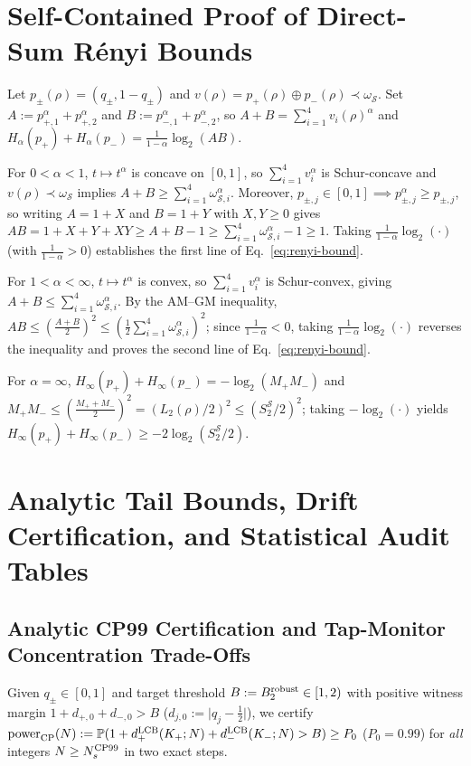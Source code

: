 \documentclass{iopjournal}
\newcommand{\Sset}{\mathcal{S}}
\newcommand{\abs}[1]{\lvert #1\rvert}
\begin{document}
\section{Self-Contained Proof of Direct-Sum R\'enyi Bounds}\label{app:renyi}

Let $p_\pm(\rho) = (q_\pm, 1-q_\pm)$ and $v(\rho) = p_+(\rho) \oplus p_-(\rho) \prec \omega_{\Sset}$. Set $A := p_{+,1}^\alpha + p_{+,2}^\alpha$ and $B := p_{-,1}^\alpha + p_{-,2}^\alpha$, so $A + B = \sum_{i=1}^4 v_i(\rho)^\alpha$ and $H_\alpha(p_+) + H_\alpha(p_-) = \frac{1}{1-\alpha}\log_2(AB)$.

For $0 < \alpha < 1$, $t \mapsto t^\alpha$ is concave on $[0,1]$, so $\sum_{i=1}^4 v_i^\alpha$ is Schur-concave and $v(\rho) \prec \omega_{\Sset}$ implies $A + B \ge \sum_{i=1}^4 \omega_{\Sset,i}^\alpha$. Moreover, $p_{\pm,j} \in [0,1] \implies p_{\pm,j}^\alpha \ge p_{\pm,j}$, so writing $A = 1+X$ and $B = 1+Y$ with $X,Y \ge 0$ gives $AB = 1 + X + Y + XY \ge A + B - 1 \ge \sum_{i=1}^4 \omega_{\Sset,i}^\alpha - 1 \ge 1$. Taking $\frac{1}{1-\alpha}\log_2(\cdot)$ (with $\frac{1}{1-\alpha} > 0$) establishes the first line of Eq.~\eqref{eq:renyi-bound}.

For $1 < \alpha < \infty$, $t \mapsto t^\alpha$ is convex, so $\sum_{i=1}^4 v_i^\alpha$ is Schur-convex, giving $A + B \le \sum_{i=1}^4 \omega_{\Sset,i}^\alpha$. By the AM--GM inequality, $AB \le (\frac{A+B}{2})^2 \le (\frac{1}{2}\sum_{i=1}^4 \omega_{\Sset,i}^\alpha)^2$; since $\frac{1}{1-\alpha} < 0$, taking $\frac{1}{1-\alpha}\log_2(\cdot)$ reverses the inequality and proves the second line of Eq.~\eqref{eq:renyi-bound}.

For $\alpha = \infty$, $H_\infty(p_+) + H_\infty(p_-) = -\log_2(M_+ M_-)$ and $M_+ M_- \le (\frac{M_+ + M_-}{2})^2 = (L_2(\rho)/2)^2 \le (S_2^{\Sset}/2)^2$; taking $-\log_2(\cdot)$ yields $H_\infty(p_+)+H_\infty(p_-) \ge -2\log_2(S_2^{\Sset}/2)$.

\section{Analytic Tail Bounds, Drift Certification, and Statistical Audit Tables}\label{app:cp-tail}

\subsection{Analytic CP99 Certification and Tap-Monitor Concentration Trade-Offs}\label{subsec:cp-details}
Given $q_\pm \in [0,1]$ and target threshold $B := B_2^{\rm robust} \in [1,2)$ with positive witness margin $1 + d_{+,0} + d_{-,0} > B$ ($d_{j,0} := \abs{q_j - \frac{1}{2}}$), we certify $\operatorname{power}_{\rm CP}(N) := \mathbb{P}(1 + d_+^{\rm LCB}(K_+;N) + d_-^{\rm LCB}(K_-;N) > B) \ge P_0$ ($P_0 = 0.99$) for \emph{all} integers $N \ge N_s^{\rm CP99}$ in two exact steps.
\end{document}

